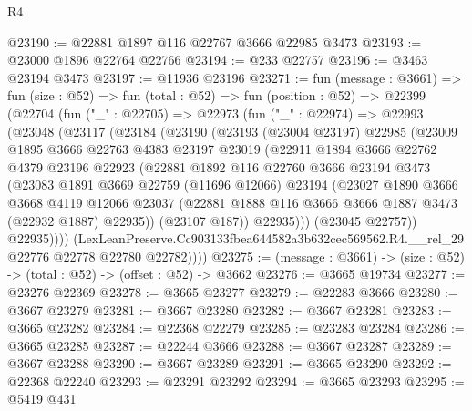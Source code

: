 \begin{lexlean}{R4}
\begin{coremodule}
@23190 := @22881 @1897 @116 @22767 @3666 @22985 @3473
@23193 := @23000 @1896 @22764 @22766
@23194 := @233 @22757
@23196 := @3463 @23194 @3473
@23197 := @11936 @23196
@23271 := fun (message : @3661) =>
  fun (size : @52) =>
  fun (total : @52) =>
  fun (position : @52) =>
  @22399
    (@22704
      (fun ("_" : @22705) =>
      @22973
        (fun ("_" : @22974) =>
        @22993
          (@23048
            (@23117
              (@23184
                (@23190
                  (@23193
                    (@23004 @23197)
                    @22985
                    (@23009
                      @1895
                      @3666
                      @22763
                      @4383
                      @23197
                      @23019
                      (@22911
                        @1894
                        @3666
                        @22762
                        @4379
                        @23196
                        @22923
                        (@22881
                          @1892
                          @116
                          @22760
                          @3666
                          @23194
                          @3473
                          (@23083
                            @1891
                            @3669
                            @22759
                            (@11696 @12066)
                            @23194
                            (@23027
                              @1890
                              @3666
                              @3668
                              @4119
                              @12066
                              @23037
                              (@22881 @1888 @116 @3666 @3666 @1887 @3473 (@22932 @1887) @22935))
                            (@23107 @187))
                          @22935)))
                    (@23045 @22757))
                  @22935))))
          (LexLeanPreserve.Cc903133fbea644582a3b632cec569562.R4.__rel_29
            @22776
            @22778
            @22780
            @22782))))
@23275 := (message : @3661) -> (size : @52) -> (total : @52) -> (offset : @52) -> @3662
@23276 := @3665 @19734
@23277 := @23276 @22369
@23278 := @3665 @23277
@23279 := @22283 @3666
@23280 := @3667 @23279
@23281 := @3667 @23280
@23282 := @3667 @23281
@23283 := @3665 @23282
@23284 := @22368 @22279
@23285 := @23283 @23284
@23286 := @3665 @23285
@23287 := @22244 @3666
@23288 := @3667 @23287
@23289 := @3667 @23288
@23290 := @3667 @23289
@23291 := @3665 @23290
@23292 := @22368 @22240
@23293 := @23291 @23292
@23294 := @3665 @23293
@23295 := @5419 @431

\end{coremodule}
\end{lexlean}
